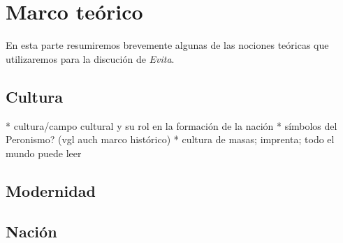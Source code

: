 \section{Marco teórico}

En esta parte resumiremos brevemente algunas de las nociones teóricas que utilizaremos para la discución de \textit{Evita}.

\subsection{Cultura}

* cultura/campo cultural y su rol en la formación de la nación
  * símbolos del Peronismo? (vgl auch marco histórico)
  * cultura de masas; imprenta; todo el mundo puede leer

\subsection{Modernidad}

\subsection{Nación}


